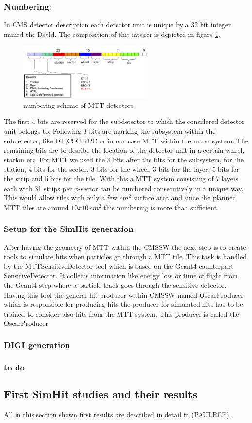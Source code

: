 		\subsubsection*{Numbering:}
		In CMS detector description each detector unit is unique by a 32 bit integer named the DetId.
		The composition of this integer is depicted in figure \ref{fig:numbering}.
		\begin{figure}[htbp]
			\centering
			\includegraphics[width=0.6\textwidth]{Figures/erdogan/numbering.png}
			\caption{numbering scheme of MTT detectors.}
			\label{fig:numbering}
		\end{figure}
		The first 4 bits are reserved for the subdetector to which the considered detector unit belongs to.
		Following 3 bits are marking the subsystem within the subdetector, like DT,CSC,RPC or in our case MTT within the muon system.
		The remaining bits are to desribe the location of the detector unit in a certain wheel, station etc.
		For MTT we used the 3 bits after the bits for the subsystem, for the station, 4 bits for the sector, 3 bits for the wheel, 3 bits for the layer, 5 bits for the strip and 5 bits for the tile.
		With this a MTT system consisting of 7 layers each with 31 strips per $\phi$-sector can be numbered consecutively in a unique way.
		This would allow tiles with only a few $cm^2$ surface area and since the planned MTT tiles are around $10x10\,cm^2$ this numbering is more than sufficient.
	\subsubsection{Setup for the SimHit generation}
		After having the geometry of MTT within the CMSSW the next step is to create tools to simulate hits when particles go through a MTT tile.
		This task is handled by the MTTSensitiveDetector tool which is based on the Geant4 counterpart SensitiveDetector.
		It collects information like energy loss or time of flight from the Geant4 step where a particle track goes through the sensitive detector.
		Having this tool the general hit producer within CMSSW named OscarProducer which is responsible for producing hits 
		the producer for simulated hits has to be trained to consider also hits from the MTT system.
		This producer is called the OscarProducer  
	\subsubsection{DIGI generation}
	\subsubsection{to do}
\subsection{First SimHit studies and their results}
	All in this section shown first results are described in detail in (PAULREF).
